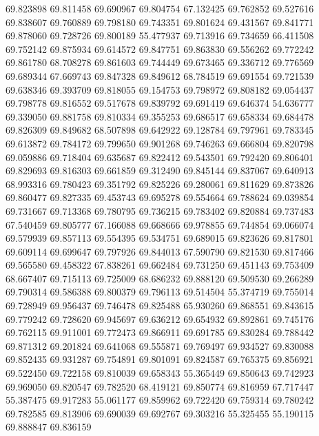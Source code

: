 69.823898
69.811458
69.690967
69.804754
67.132425
69.762852
69.527616
69.838607
69.760889
69.798180
69.743351
69.801624
69.431567
69.841771
69.878060
69.728726
69.800189
55.477937
69.713916
69.734659
66.411508
69.752142
69.875934
69.614572
69.847751
69.863830
69.556262
69.772242
69.861780
68.708278
69.861603
69.744449
69.673465
69.336712
69.776569
69.689344
67.669743
69.847328
69.849612
68.784519
69.691554
69.721539
69.638346
69.393709
69.818055
69.154753
69.798972
69.808182
69.054437
69.798778
69.816552
69.517678
69.839792
69.691419
69.646374
54.636777
69.339050
69.881758
69.810334
69.355253
69.686517
69.658334
69.684478
69.826309
69.849682
68.507898
69.642922
69.128784
69.797961
69.783345
69.613872
69.784172
69.799650
69.901268
69.746263
69.666804
69.820798
69.059886
69.718404
69.635687
69.822412
69.543501
69.792420
69.806401
69.829693
69.816303
69.661859
69.312490
69.845144
69.837067
69.640913
68.993316
69.780423
69.351792
69.825226
69.280061
69.811629
69.873826
69.860477
69.827335
69.453743
69.695278
69.554664
69.788624
69.039854
69.731667
69.713368
69.780795
69.736215
69.783402
69.820884
69.737483
67.540459
69.805777
67.166088
69.668666
69.978855
69.744854
69.066074
69.579939
69.857113
69.554395
69.534751
69.689015
69.823626
69.817801
69.609114
69.699647
69.797926
69.844013
67.590790
69.821530
69.817466
69.565580
69.458322
67.838261
69.662484
69.731250
69.451143
69.753409
68.667407
69.715113
69.725009
68.686232
69.888120
69.509530
69.266289
69.790314
69.586388
69.800379
69.796113
69.514504
55.374719
69.755014
69.728949
69.956437
69.746478
69.825488
65.930260
69.868551
69.843615
69.779242
69.728620
69.945697
69.636212
69.654932
69.892861
69.745176
69.762115
69.911001
69.772473
69.866911
69.691785
69.830284
69.788442
69.871312
69.201824
69.641068
69.555871
69.769497
69.934527
69.830088
69.852435
69.931287
69.754891
69.801091
69.824587
69.765375
69.856921
69.522450
69.722158
69.810039
69.658343
55.365449
69.850643
69.742923
69.969050
69.820547
69.782520
68.419121
69.850774
69.816959
67.717447
55.387475
69.917283
55.061177
69.859962
69.722420
69.759314
69.780242
69.782585
69.813906
69.690039
69.692767
69.303216
55.325455
55.190115
69.888847
69.836159
